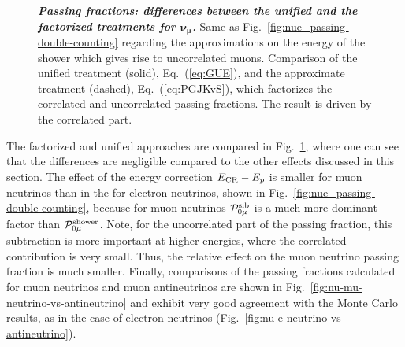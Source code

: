 \begin{figure}
	\centering
	\caption{\textbf{\textit{Passing fractions: differences between the unified and the factorized treatments for $\boldsymbol{\nu_\mu}$.}} Same as Fig.~\ref{fig:nue_passing-double-counting} regarding the approximations on the energy of the shower which gives rise to uncorrelated muons. Comparison of the unified treatment (solid), Eq.~(\ref{eq:GUE}), and the approximate treatment (dashed), Eq.~(\ref{eq:PGJKvS}), which factorizes the correlated and uncorrelated passing fractions. The result is driven by the correlated part.}
	\label{fig:nu-mu-unified-effect}
\end{figure}

The factorized and unified approaches are compared in Fig.~\ref{fig:nu-mu-unified-effect}, where one can see that the differences are negligible compared to the other effects discussed in this section.
The effect of the energy correction $E_{\rm CR}-E_p$ is smaller for muon neutrinos than in the for electron neutrinos, shown in Fig.~\ref{fig:nue_passing-double-counting}, because for muon neutrinos ${\cal P}_{0\mu}^{\rm sib}$ is a much more dominant factor than ${\cal P}_{0\mu}^{\rm shower}$.
Note, for the uncorrelated part of the passing fraction, this subtraction is more important at higher energies, where the correlated contribution is very small.
Thus, the relative effect on the muon neutrino passing fraction is much smaller.
Finally, comparisons of the passing fractions calculated for muon neutrinos and muon antineutrinos are shown in Fig.~\ref{fig:nu-mu-neutrino-vs-antineutrino} and exhibit very good agreement with the Monte Carlo results, as in the case of electron neutrinos (Fig.~\ref{fig:nu-e-neutrino-vs-antineutrino}).

